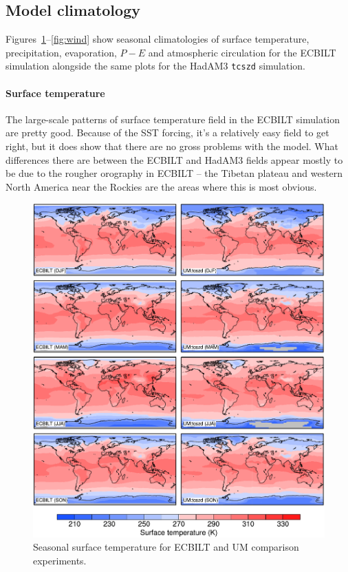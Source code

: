 \documentclass[a4paper,11pt,article]{article}
\begin{document}
\subsection{Model climatology}

Figures~\ref{fig:ts}--\ref{fig:wind} show seasonal climatologies of
surface temperature, precipitation, evaporation, $P-E$ and atmospheric
circulation for the ECBILT simulation alongside the same plots for the
HadAM3 \texttt{tcszd} simulation.

\paragraph{Surface temperature}

The large-scale patterns of surface temperature field in the ECBILT
simulation are pretty good.  Because of the SST forcing, it's a
relatively easy field to get right, but it does show that there are no
gross problems with the model.  What differences there are between the
ECBILT and HadAM3 fields appear mostly to be due to the rougher
orography in ECBILT -- the Tibetan plateau and western North America
near the Rockies are the areas where this is most obvious.

\begin{figure}
  \begin{center}
    \includegraphics[width=\textwidth]{../expt-1/plots/ts-plots}
  \end{center}
  \caption{Seasonal surface temperature for ECBILT and UM comparison
    experiments.}
  \label{fig:ts}
\end{figure}
\end{document}
